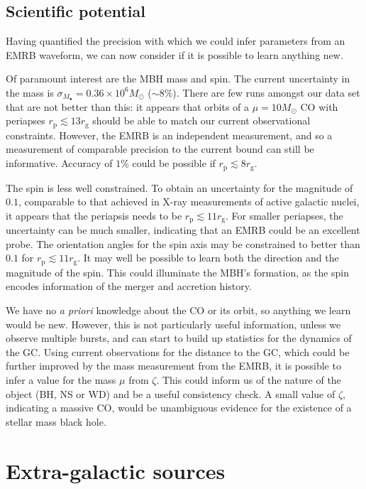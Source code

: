 \documentclass[useAMS,usedcolumn,usegraphicx,usenatbib]{mn2e}
\newcommand{\sub}[1]{\ensuremath{_\mathrm{#1}}}
\begin{document}
\subsection{Scientific potential}

Having quantified the precision with which we could infer parameters from an EMRB waveform, we can now consider if it is possible to learn anything new.

Of paramount interest are the MBH mass and spin. The current uncertainty in the mass is $\sigma_{M_\bullet} = 0.36 \times 10^6 M_\odot$ ($\sim 8\%$). There are few runs amongst our data set that are not better than this: it appears that orbits of a $\mu = 10 M_\odot$ CO with periapses $r\sub{p} \lesssim 13 r\sub{g}$ should be able to match our current observational constraints. However, the EMRB is an independent measurement, and so a measurement of comparable precision to the current bound can still be informative. Accuracy of $1\%$ could be possible if $r\sub{p} \lesssim 8 r\sub{g}$.

The spin is less well constrained. To obtain an uncertainty for the magnitude of $0.1$, comparable to that achieved in X-ray measurements of active galactic nuclei, it appears that the periapsis needs to be $r\sub{p} \lesssim 11 r\sub{g}$. For smaller periapses, the uncertainty can be much smaller, indicating that an EMRB could be an excellent probe. The orientation angles for the spin axis may be constrained to better than $0.1$ for $r\sub{p} \lesssim 11 r\sub{g}$. It may well be possible to learn both the direction and the magnitude of the spin. This could illuminate the MBH's formation, as the spin encodes information of the merger and accretion history.

We have no {\it a priori} knowledge about the CO or its orbit, so anything we learn would be new. However, this is not particularly useful information, unless we observe multiple bursts, and can start to build up statistics for the dynamics of the GC. Using current observations for the distance to the GC, which could be further improved by the mass measurement from the EMRB, it is possible to infer a value for the mass $\mu$ from $\zeta$. This could inform us of the nature of the object (BH, NS or WD) and be a useful consistency check. A small value of $\zeta$, indicating a massive CO, would be unambiguous evidence for the existence of a stellar mass black hole.

\section{Extra-galactic sources}\label{sec:Extragal}
\end{document}
